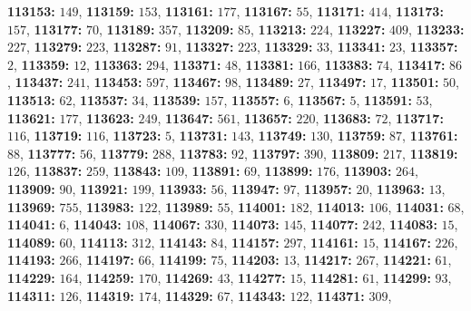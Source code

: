 \textsf{\bfseries 113153:} $149$, \textsf{\bfseries 113159:} $153$, \textsf{\bfseries 113161:} $177$, \textsf{\bfseries 113167:} $55$, \textsf{\bfseries 113171:} $414$, \textsf{\bfseries 113173:} $157$, \textsf{\bfseries 113177:} $70$, \textsf{\bfseries 113189:} $357$, \textsf{\bfseries 113209:} $85$, \textsf{\bfseries 113213:} $224$, \textsf{\bfseries 113227:} $409$, \textsf{\bfseries 113233:} $227$, \textsf{\bfseries 113279:} $223$, \textsf{\bfseries 113287:} $91$, \textsf{\bfseries 113327:} $223$, \textsf{\bfseries 113329:} $33$, \textsf{\bfseries 113341:} $23$, \textsf{\bfseries 113357:} $2$, \textsf{\bfseries 113359:} $12$, \textsf{\bfseries 113363:} $294$, \textsf{\bfseries 113371:} $48$, \textsf{\bfseries 113381:} $166$, \textsf{\bfseries 113383:} $74$, \textsf{\bfseries 113417:} $86$, \textsf{\bfseries 113437:} $241$, \textsf{\bfseries 113453:} $597$, \textsf{\bfseries 113467:} $98$, \textsf{\bfseries 113489:} $27$, \textsf{\bfseries 113497:} $17$, \textsf{\bfseries 113501:} $50$, \textsf{\bfseries 113513:} $62$, \textsf{\bfseries 113537:} $34$, \textsf{\bfseries 113539:} $157$, \textsf{\bfseries 113557:} $6$, \textsf{\bfseries 113567:} $5$, \textsf{\bfseries 113591:} $53$, \textsf{\bfseries 113621:} $177$, \textsf{\bfseries 113623:} $249$, \textsf{\bfseries 113647:} $561$, \textsf{\bfseries 113657:} $220$, \textsf{\bfseries 113683:} $72$, \textsf{\bfseries 113717:} $116$, \textsf{\bfseries 113719:} $116$, \textsf{\bfseries 113723:} $5$, \textsf{\bfseries 113731:} $143$, \textsf{\bfseries 113749:} $130$, \textsf{\bfseries 113759:} $87$, \textsf{\bfseries 113761:} $88$, \textsf{\bfseries 113777:} $56$, \textsf{\bfseries 113779:} $288$, \textsf{\bfseries 113783:} $92$, \textsf{\bfseries 113797:} $390$, \textsf{\bfseries 113809:} $217$, \textsf{\bfseries 113819:} $126$, \textsf{\bfseries 113837:} $259$, \textsf{\bfseries 113843:} $109$, \textsf{\bfseries 113891:} $69$, \textsf{\bfseries 113899:} $176$, \textsf{\bfseries 113903:} $264$, \textsf{\bfseries 113909:} $90$, \textsf{\bfseries 113921:} $199$, \textsf{\bfseries 113933:} $56$, \textsf{\bfseries 113947:} $97$, \textsf{\bfseries 113957:} $20$, \textsf{\bfseries 113963:} $13$, \textsf{\bfseries 113969:} $755$, \textsf{\bfseries 113983:} $122$, \textsf{\bfseries 113989:} $55$, \textsf{\bfseries 114001:} $182$, \textsf{\bfseries 114013:} $106$, \textsf{\bfseries 114031:} $68$, \textsf{\bfseries 114041:} $6$, \textsf{\bfseries 114043:} $108$, \textsf{\bfseries 114067:} $330$, \textsf{\bfseries 114073:} $145$, \textsf{\bfseries 114077:} $242$, \textsf{\bfseries 114083:} $15$, \textsf{\bfseries 114089:} $60$, \textsf{\bfseries 114113:} $312$, \textsf{\bfseries 114143:} $84$, \textsf{\bfseries 114157:} $297$, \textsf{\bfseries 114161:} $15$, \textsf{\bfseries 114167:} $226$, \textsf{\bfseries 114193:} $266$, \textsf{\bfseries 114197:} $66$, \textsf{\bfseries 114199:} $75$, \textsf{\bfseries 114203:} $13$, \textsf{\bfseries 114217:} $267$, \textsf{\bfseries 114221:} $61$, \textsf{\bfseries 114229:} $164$, \textsf{\bfseries 114259:} $170$, \textsf{\bfseries 114269:} $43$, \textsf{\bfseries 114277:} $15$, \textsf{\bfseries 114281:} $61$, \textsf{\bfseries 114299:} $93$, \textsf{\bfseries 114311:} $126$, \textsf{\bfseries 114319:} $174$, \textsf{\bfseries 114329:} $67$, \textsf{\bfseries 114343:} $122$, \textsf{\bfseries 114371:} $309$, 
